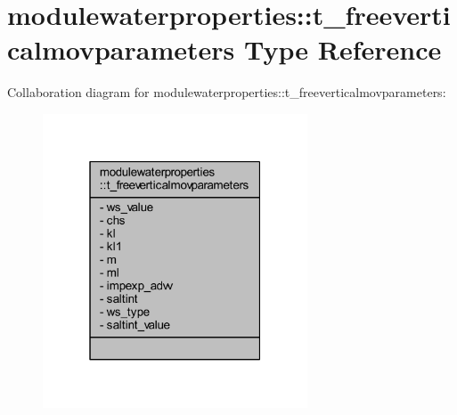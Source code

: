 \hypertarget{structmodulewaterproperties_1_1t__freeverticalmovparameters}{}\section{modulewaterproperties\+:\+:t\+\_\+freeverticalmovparameters Type Reference}
\label{structmodulewaterproperties_1_1t__freeverticalmovparameters}


Collaboration diagram for modulewaterproperties\+:\+:t\+\_\+freeverticalmovparameters\+:\nopagebreak
\begin{figure}[H]
\begin{center}
\leavevmode
\includegraphics[width=223pt]{structmodulewaterproperties_1_1t__freeverticalmovparameters__coll__graph}
\end{center}
\end{figure}
